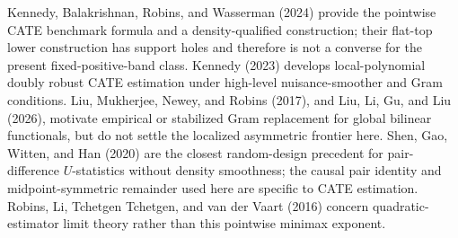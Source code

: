 Kennedy, Balakrishnan, Robins, and Wasserman (2024) provide the pointwise CATE benchmark formula and a density-qualified construction; their flat-top lower construction has support holes and therefore is not a converse for the present fixed-positive-band class.  Kennedy (2023) develops local-polynomial doubly robust CATE estimation under high-level nuisance-smoother and Gram conditions.  Liu, Mukherjee, Newey, and Robins (2017), and Liu, Li, Gu, and Liu (2026), motivate empirical or stabilized Gram replacement for global bilinear functionals, but do not settle the localized asymmetric frontier here.  Shen, Gao, Witten, and Han (2020) are the closest random-design precedent for pair-difference \(U\)-statistics without density smoothness; the causal pair identity and midpoint-symmetric remainder used here are specific to CATE estimation.  Robins, Li, Tchetgen Tchetgen, and van der Vaart (2016) concern quadratic-estimator limit theory rather than this pointwise minimax exponent.